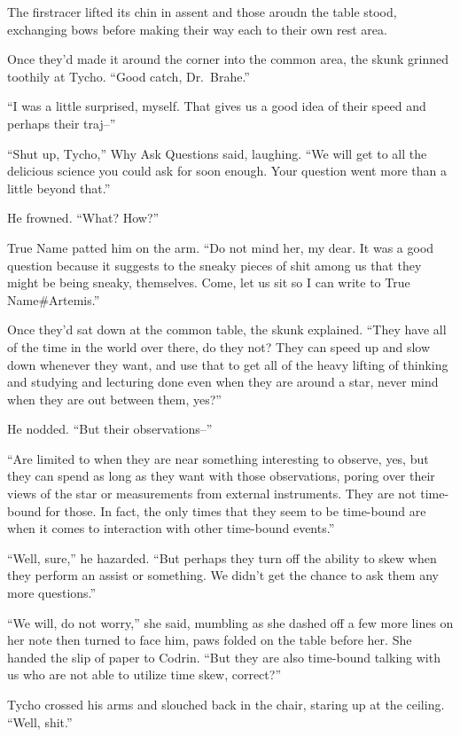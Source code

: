The firstracer lifted its chin in assent and those aroudn the table stood, exchanging bows before making their way each to their own rest area.

Once they'd made it around the corner into the common area, the skunk grinned toothily at Tycho. ``Good catch, Dr.~Brahe.''

``I was a little surprised, myself. That gives us a good idea of their speed and perhaps their traj--''

``Shut up, Tycho,'' Why Ask Questions said, laughing. ``We will get to all the delicious science you could ask for soon enough. Your question went more than a little beyond that.''

He frowned. ``What? How?''

True Name patted him on the arm. ``Do not mind her, my dear. It was a good question because it suggests to the sneaky pieces of shit among us that they might be being sneaky, themselves. Come, let us sit so I can write to True Name\#Artemis.''

Once they'd sat down at the common table, the skunk explained. ``They have all of the time in the world over there, do they not? They can speed up and slow down whenever they want, and use that to get all of the heavy lifting of thinking and studying and lecturing done even when they are around a star, never mind when they are out between them, yes?''

He nodded. ``But their observations--''

``Are limited to when they are near something interesting to observe, yes, but they can spend as long as they want with those observations, poring over their views of the star or measurements from external instruments. They are not time-bound for those. In fact, the only times that they seem to be time-bound are when it comes to interaction with other time-bound events.''

``Well, sure,'' he hazarded. ``But perhaps they turn off the ability to skew when they perform an assist or something. We didn't get the chance to ask them any more questions.''

``We will, do not worry,'' she said, mumbling as she dashed off a few more lines on her note then turned to face him, paws folded on the table before her. She handed the slip of paper to Codrin. ``But they are also time-bound talking with us who are not able to utilize time skew, correct?''

Tycho crossed his arms and slouched back in the chair, staring up at the ceiling. ``Well, shit.''

